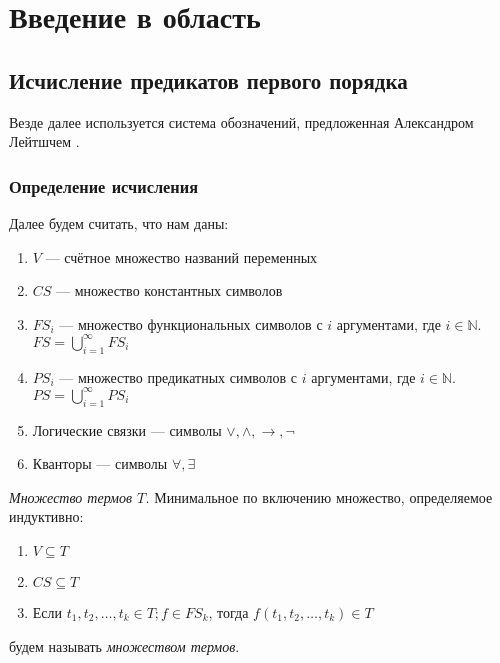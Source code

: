 \chapter{Введение в область}
\startrelatedwork
\label{sec:chap1}

\section{Исчисление предикатов первого порядка}

Везде далее используется система обозначений, предложенная Александром Лейтшчем \cite{Leitsch:1997:RC:260906}.

\subsection{Определение исчисления}

Далее будем считать, что нам даны:
\begin{enumerate}
	\item $V$    --- счётное множество названий переменных
    \item $CS$   --- множество константных символов
    \item $FS_i$ --- множество функциональных символов с $i$ аргументами, где $i \in \mathbb{N}$. \\
    $FS = \bigcup\limits_{i=1}^{\infty} FS_{i}$
    \item $PS_i$ --- множество предикатных символов с $i$ аргументами, где $i \in \mathbb{N}$. \\
    $PS = \bigcup\limits_{i=1}^{\infty} PS_{i}$
    \item Логические связки --- символы $\vee, \wedge, \rightarrow, \neg$
    \item Кванторы --- символы $\forall, \exists$
\end{enumerate}



\begin{definition}
  \emph{Множество термов $T$.} Минимальное по включению множество, определяемое индуктивно:
  \begin{enumerate}
  	\item $V \subseteq T$
    \item $CS \subseteq T$
    \item Если $t_1, t_2, \ldots, t_k \in T; f \in FS_k$, тогда $f(t_1, t_2, \ldots, t_k) \in T$
  \end{enumerate}
  будем называть \emph{множеством термов}.
\end{definition}

